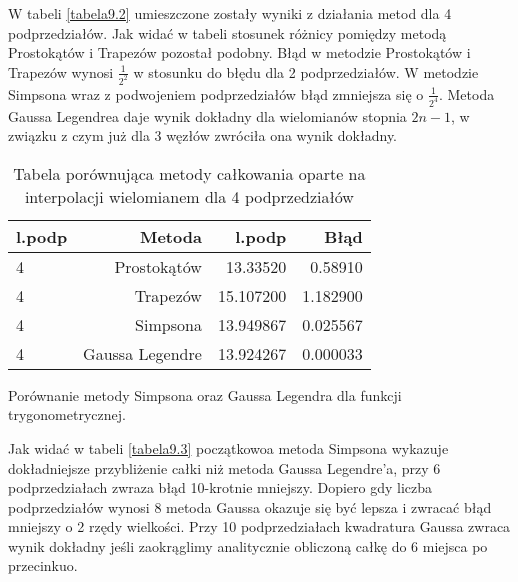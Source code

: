 \documentclass[12pt,twoside]{article}
\begin{document}
W tabeli \eqref{tabela9.2} umieszczone zostały wyniki z działania metod dla 4 podprzedziałów.
Jak widać w tabeli stosunek różnicy pomiędzy metodą Prostokątów i Trapezów pozostał podobny.
Błąd w metodzie Prostokątów i Trapezów wynosi $\frac{1}{2^2}$ w stosunku do błędu dla 2 podprzedziałów.
W metodzie Simpsona wraz z podwojeniem podprzedziałów błąd zmniejsza się o $\frac{1}{2^4}$.
Metoda Gaussa Legendrea daje wynik dokładny dla wielomianów stopnia $2n-1$, w związku z czym już dla 3 węzłów zwróciła ona wynik dokładny.


\begin{table}
\centering 
\caption{Tabela porównująca metody całkowania oparte na interpolacji wielomianem dla 4 podprzedziałów }
\label{tabela9.2}
\begin{tabular}{lrrr}
\toprule
{l.podp} & Metoda &  l.podp &  Błąd \\
\midrule
4  &     Prostokątów & 13.33520 &   0.58910  \\
4  &     Trapezów & 15.107200 &  1.182900  \\
4  &     Simpsona & 13.949867 &   0.025567  \\
4  &     Gaussa Legendre & 13.924267 &  0.000033  \\
\bottomrule
\end{tabular}
\end{table}



Porównanie metody Simpsona oraz Gaussa Legendra dla funkcji trygonometrycznej.

Jak widać w tabeli \eqref{tabela9.3} początkowoa metoda Simpsona wykazuje dokładniejsze przybliżenie całki niż metoda Gaussa Legendre'a, przy 6 podprzedziałach zwraza błąd 10-krotnie mniejszy. Dopiero gdy liczba podprzedziałów wynosi 8 metoda Gaussa okazuje się być lepsza i zwracać błąd mniejszy o 2 rzędy wielkości. 
Przy 10 podprzedziałach kwadratura Gaussa zwraca wynik dokładny jeśli zaokrąglimy analitycznie obliczoną całkę do 6 miejsca po przecinkuo.
\end{document}
